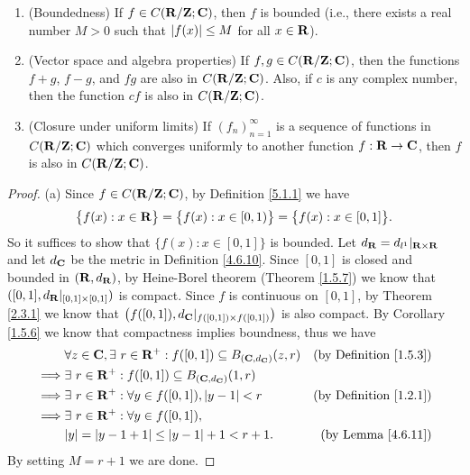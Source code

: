 \begin{lemma}\label{5.1.5}
    \quad
    \begin{enumerate}
        \item (Boundedness)
              If \(f \in C(\mathbf{R} / \mathbf{Z} ; \mathbf{C})\), then \(f\) is bounded
              (i.e., there exists a real number \(M > 0\) such that \(\left\lvert f(x)\right\rvert \leq M\) for all \(x \in \mathbf{R}\)).
        \item (Vector space and algebra properties)
              If \(f, g \in C(\mathbf{R} / \mathbf{Z} ; \mathbf{C})\), then the functions \(f + g\), \(f - g\), and \(f g\) are also in \(C(\mathbf{R} / \mathbf{Z} ; \mathbf{C})\).
              Also, if \(c\) is any complex number, then the function \(cf\) is also in \(C(\mathbf{R} / \mathbf{Z} ; \mathbf{C})\).
        \item (Closure under uniform limits)
              If \((f_n)_{n = 1}^\infty\) is a sequence of functions in \(C(\mathbf{R} / \mathbf{Z} ; \mathbf{C})\) which converges uniformly to another function \(f : \mathbf{R} \to \mathbf{C}\), then \(f\) is also in \(C(\mathbf{R} / \mathbf{Z} ; \mathbf{C})\).
    \end{enumerate}
\end{lemma}

\begin{proof}{(a)}
    Since \(f \in C(\mathbf{R} / \mathbf{Z} ; \mathbf{C})\), by Definition \ref{5.1.1} we have
    \[
        \big\{f(x) : x \in \mathbf{R}\big\} = \big\{f(x) : x \in [0, 1)\big\} = \big\{f(x) : x \in [0, 1]\big\}.
    \]
    So it suffices to show that \(\{f(x) : x \in [0, 1]\}\) is bounded.
    Let \(d_{\mathbf{R}} = d_{l^1}|_{\mathbf{R} \times \mathbf{R}}\) and let \(d_{\mathbf{C}}\) be the metric in Definition \ref{4.6.10}.
    Since \([0, 1]\) is closed and bounded in \((\mathbf{R}, d_{\mathbf{R}})\), by Heine-Borel theorem (Theorem \ref{1.5.7}) we know that \(([0, 1], d_{\mathbf{R}}|_{[0, 1] \times [0, 1]})\) is compact.
    Since \(f\) is continuous on \([0, 1]\), by Theorem \ref{2.3.1} we know that \(\big(f([0, 1]), d_{\mathbf{C}}|_{f([0, 1]) \times f([0, 1])}\big)\) is also compact.
    By Corollary \ref{1.5.6} we know that compactness implies boundness, thus we have
    \begin{align*}
                 & \forall z \in \C, \exists\ r \in \R^+ : f([0, 1]) \subseteq B_{(\C, d_{\C})}(z, r) & \text{(by Definition \ref{1.5.3})} \\
        \implies & \exists\ r \in \R^+ : f([0, 1]) \subseteq B_{(\C, d_{\C})}(1, r)                                                        \\
        \implies & \exists\ r \in \R^+ : \forall y \in f([0, 1]), \abs{y - 1} < r                     & \text{(by Definition \ref{1.2.1})} \\
        \implies & \exists\ r \in \R^+ : \forall y \in f([0, 1]),                                                                          \\
                 & \abs{y} = \abs{y - 1 + 1} \leq \abs{y - 1} + 1 < r + 1.                            & \text{(by Lemma \ref{4.6.11})}
    \end{align*}
    By setting \(M = r + 1\) we are done.
\end{proof}

